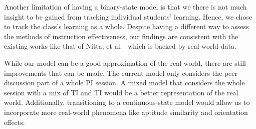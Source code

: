 \documentclass[twocolumn,secnumarabic,amssymb, nobibnotes, aps, prd]{revtex4-2}
\begin{document}
    Another limitation of having a binary-state model is that we there is not much insight to be gained from tracking individual students' learning.
    Hence, we chose to track the class's learning as a whole.
    Despite having a different way to assess the methods of instruction effectiveness, our findings are consistent with the existing works like that of Nitta, et al.~\cite{nitta2019mathematical} which is backed by real-world data.

    While our model can be a good approximation of the real world, there are still improvements that can be made.
    The current model only considers the peer discussion part of a whole PI session.
    A mixed model that considers the whole session with a mix of TI and TI would be a better representation of the real world.
    Additionally, transitioning to a continuous-state model would allow us to incorporate more real-world phenomena like aptitude similarity and orientation effects.



\end{document}
